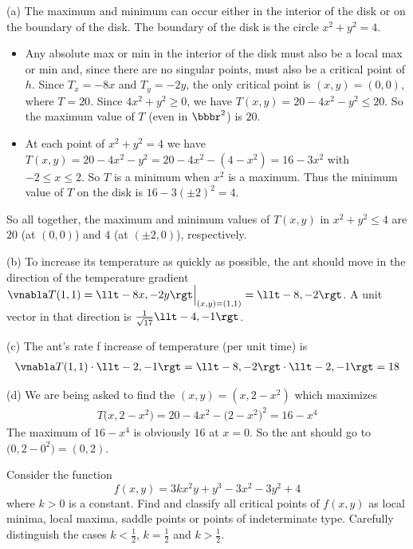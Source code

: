 \begin{solution}
(a)
The maximum and minimum can occur either in the interior
    of the disk or on the boundary of the disk. The boundary
    of the disk is the circle $x^2+y^2=4$.
\begin{itemize}
\item Any absolute max or min in the interior of the disk
      must also be a local max or min and, since there are no
      singular points, must also be a critical point of $h$.
      Since $T_x=-8x$ and $T_y=-2y$, the only critical point is
      $(x,y)=(0,0)$, where $T=20$.  Since $4x^2+y^2\ge 0$, 
      we have $T(x,y)=20-4x^2-y^2\le 20$. So the maximum value
      of $T$ (even in $\bbbr^2$) is $20$.    

\item At each point of $x^2+y^2=4$ we have 
           $T(x,y)=20-4x^2-y^2=20 -4x^2-(4-x^2)=16-3x^2$ 
           with $-2\le x\le 2$. So $T$ is a minimum when $x^2$ is a maximum.
           Thus the minimum value of $T$ on the disk is $16-3(\pm 2)^2=4$. 
\end{itemize}
So all together, the maximum and minimum values of $T(x,y)$ in $x^2+y^2\le 4$
     are $20$ (at $(0,0)$) and  $4$ (at $(\pm 2,0)$), respectively.

(b) To increase its temperature as quickly as possible, the ant should
    move in the direction of the temperature gradient
    $\vnabla T(1,1)=\llt -8x,-2y\rgt\Big|_{(x,y)=(1,1)}=\llt -8,-2\rgt$.
    A unit vector in that direction is $\frac{1}{\sqrt{17}}\llt -4,-1\rgt$. 

(c) The ant's rate f increase of temperature (per unit time) is
\begin{align*}
 \vnabla T(1,1)\cdot\llt -2,-1\rgt
=\llt -8,-2\rgt\cdot\llt -2,-1\rgt
=18
\end{align*}

(d) We are being asked to find the $(x,y)=(x,2-x^2)$ which maximizes
\begin{align*}
T\big(x,2-x^2\big) =20 -4x^2-\big(2-x^2\big)^2
                   = 16-x^4
\end{align*}
The maximum of $16-x^4$ is obviously $16$ at $x=0$. So the ant should
go to $\big(0,2-0^2\big)=(0,2)$.
\end{solution}


\begin{question}[M200 2014A] %
Consider the function
\begin{equation*}
f (x,y) = 3kx^2 y + y^3 - 3x^2 - 3y^2 + 4
\end{equation*}
where $k > 0$ is a constant. 
Find and classify all critical points of $f(x,y)$ as local minima,
local maxima, saddle points or points of indeterminate type. 
Carefully distinguish the cases $k < \frac{1}{2}$, $k = \frac{1}{2}$ 
and $k > \frac{1}{2}$.
\end{question}

